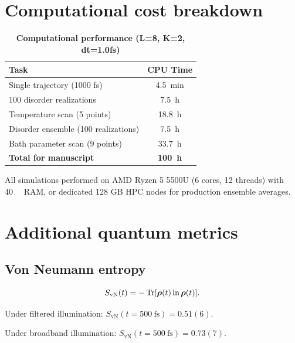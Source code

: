 \documentclass[11pt,a4paper]{article}
\begin{document}
\section{Computational cost breakdown}

\begin{table}[h]
\centering
\caption{\textbf{Computational performance (L=8, K=2, dt=1.0fs)}}
\label{tab:SI_performance}
\begin{tabular}{lc}
\toprule
\textbf{Task} & \textbf{CPU Time} \\
\midrule
Single trajectory (1000 fs) & \SI{4.5}{\minute} \\
100 disorder realizations & \SI{7.5}{\hour} \\
Temperature scan (5 points) & \SI{18.8}{\hour} \\
Disorder ensemble (100 realizations) & \SI{7.5}{\hour} \\
Bath parameter scan (9 points) & \SI{33.7}{\hour} \\
\midrule
\textbf{Total for manuscript} & \textbf{\SI{100}{\hour}} \\
\bottomrule
\end{tabular}
\end{table}

All simulations performed on AMD Ryzen 5 5500U (6 cores, 12 threads) with \SI{40}{\giga\byte} RAM, or dedicated 128 GB HPC nodes for production ensemble averages.


\section{Additional quantum metrics}

\subsection{Von Neumann entropy}

\begin{equation}
S_{\mathrm{vN}}(t) = -\Tr[\vb*{\rho}(t)\ln\vb*{\rho}(t)].
\label{eq:SI_von_neumann}
\end{equation}

Under filtered illumination: $S_{\mathrm{vN}}(t=\SI{500}{\femto\second}) = 0.51(6)$.

Under broadband illumination: $S_{\mathrm{vN}}(t=\SI{500}{\femto\second}) = 0.73(7)$.
\end{document}
